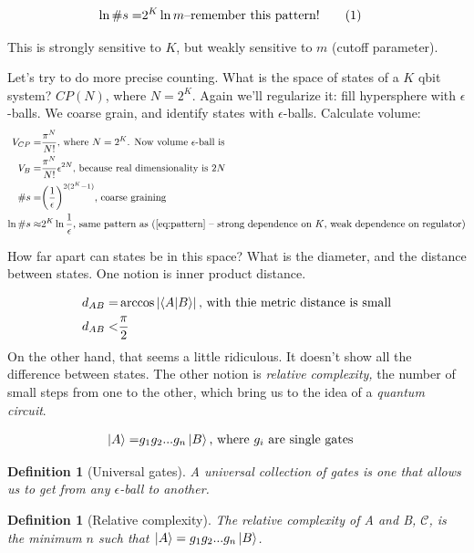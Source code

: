 \documentclass[]{article}
\newcommand\numberthis{\addtocounter{equation}{1}\tag{\theequation}}
\newtheorem{defn}[thm]{Definition}
\begin{document}
\begin{align*}
	\ln \#s =& 2^K \ln m \text{--remember this pattern!} \numberthis \label{eq:pattern}
\end{align*}

This is strongly sensitive to $K$, but weakly sensitive to $m$ (cutoff parameter).

Let's try to do more precise counting. What is the space of states of a $K$ qbit system? $CP(N)$, where $N=2^K$. Again we'll regularize it: fill hypersphere with $\epsilon$-balls. We coarse grain, and identify states with $\epsilon$-balls. Calculate volume:
\begin{align*}
	V_{CP}=& \frac{\pi^N}{N!} \text{, where $N=2^K$. Now volume $\epsilon$-ball is}\\
	V_B =& \frac{\pi^N}{N!} \epsilon^{2N} \text{, because real dimensionality is $2N$}\\
	\#s =& \bigg(\frac{1}{\epsilon}\bigg)^{2(2^K-1)} \text{, coarse graining}\\
	\ln \#s \approx & 2^K \ln \frac{1}{\epsilon} \text{, same pattern as (\ref{eq:pattern} -- strong dependence on $K$, weak dependence on regulator)}
\end{align*}

How far apart can states be in this space? What is the diameter, and the distance between states. One notion is inner product distance.

\begin{align*}
	d_{AB}=&\arccos \left|\braket{A|B}\right| \text{, with thie metric distance is small}\\
	d_{AB}<&\frac{\pi}{2}
\end{align*}
On the other hand, that seems a little ridiculous. It doesn't show all the difference between states. The other notion is \emph{relative complexity,} the number of small steps from one to the other, which bring us to the idea of a \emph{quantum circuit}.


\begin{align*}
	\ket{A} =& g_1 g_2 ... g_n \ket{B} \text{, where $g_i$ are single gates}
\end{align*}

\begin{defn}[Universal gates]
	A universal collection of gates is one that allows us to get from any $\epsilon$-ball to another.
\end{defn}

\begin{defn}[Relative complexity]
	The relative complexity of A and B, $\mathscr{C}$, is the minimum $n$ such that $\ket{A} =g_1 g_2 ... g_n \ket{B}$.
\end{defn}
\end{document}
